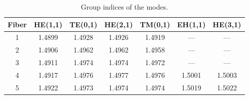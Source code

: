 \begin{table}[!t]
\caption[]{Group indices of the modes.}
\label{tab:fiberng}
\centering
\begin{tabular}{ccccccc}
Fiber & HE(1,1) & TE(0,1) & HE(2,1) & TM(0,1) & EH(1,1) & HE(3,1) \\
\hline
1 & 1.4899 & 1.4928 & 1.4926 & 1.4919 & --- & --- \\
2 & 1.4906 & 1.4962 & 1.4962 & 1.4958 & --- & --- \\
3 & 1.4911 & 1.4974 & 1.4974 & 1.4972 & --- & --- \\
4 & 1.4917 & 1.4976 & 1.4977 & 1.4976 & 1.5001 & 1.5003 \\
5 & 1.4922 & 1.4973 & 1.4974 & 1.4974 & 1.5019 & 1.5022 \\
\hline
\end{tabular}
\end{table}
